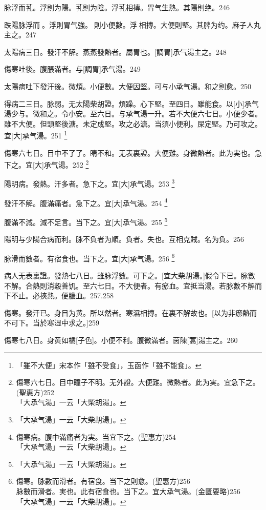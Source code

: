 \documentclass[11pt,oneside,b5paper]{ctexbook}
\begin{document}
\begin{flushleft}
脉浮而芤。浮則为陽。芤則为陰。浮芤相摶。胃气生熱。其陽則绝。246

跌陽脉浮而{𬈧}。浮則胃气強。{𬈧}則小便數。浮{𬈧}相摶。大便則堅。其脾为约。麻子人丸主之。247

太陽病三日。發汗不解。蒸蒸發熱者。屬胃也。[調胃]承气湯主之。248

傷寒吐後。腹脹滿者。与[調胃]承气湯。249

太陽病吐下發汗後。微煩。小便數。大便因堅。可与小承气湯。和之則愈。250

得病二三日。脉弱。无太陽柴胡證。煩躁。心下堅。至四日。雖能食。以[小]承气湯少与。微和之。令小安。至六日。与承气湯一升。若不大便六七日。小便少者。雖不大便。但頭堅後溏。未定成堅。攻之必溏。当須小便利。屎定堅。乃可攻之。宜[大]承气湯。251
\footnote{「雖不大便」宋本作「雖不受食」，玉函作「雖不能食」。}

傷寒六七日。目中不了了。睛不和。无表裏證。大便難。身微熱者。此为実也。急下之。宜[大]承气湯。252
\footnote{傷寒六七日。目中瞳子不明。无外證。大便難。微熱者。此为実。宜急下之。(聖惠方)252\\「大承气湯」一云「大柴胡湯」。}

陽明病。發熱。汗多者。急下之。宜[大]承气湯。253
\footnote{「大承气湯」一云「大柴胡湯」。}

發汗不解。腹滿痛者。急下之。宜[大]承气湯。254
\footnote{傷寒病。腹中滿痛者为実。当宜下之。(聖惠方)254\\「大承气湯」一云「大柴胡湯」。}

腹滿不減。減不足言。当下之。宜[大]承气湯。255
\footnote{「大承气湯」一云「大柴胡湯」。}

陽明与少陽合病而利。脉不負者为順。負者。失也。互相克賊。名为負。256

脉滑而數者。有宿食也。当下之。宜[大]承气湯。256
\footnote{傷寒。脉數而滑者。有宿食。当下之則愈。(聖惠方)256\\脉數而滑者。実也。此有宿食也。当下之。宜大承气湯。(金匱要略)256\\「大承气湯」一云「大柴胡湯」。}

病人无表裏證。發熱七八日。雖脉浮數。可下之。[宜大柴胡湯。]假令下已。脉數不解。合熱則消穀善饥。至六七日。不大便者。有瘀血。宜抵当湯。若脉數不解而下不止。必挾熱。便膿血。257.258

傷寒。發汗已。身目为黄。所以然者。寒濕相摶。在裏不解故也。[以为非瘀熱而不可下。当於寒湿中求之。]259

傷寒七八日。身黄如橘[子色]。小便不利。腹微滿者。茵陳[蒿]湯主之。260


\end{flushleft}
\end{document}
